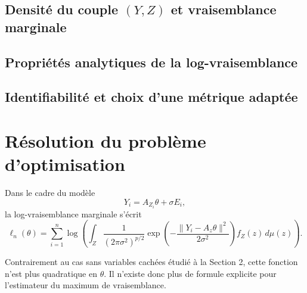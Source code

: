 \documentclass[12pt, a4paper]{article}
\theoremstyle{definition}
\begin{document}
\subsection{Densité du couple \texorpdfstring{$(Y, Z)$}{(Y,Z)} et vraisemblance marginale}
\label{subsec:densite}

\subsection{Propriétés analytiques de la log-vraisemblance}
\label{subsec:proprietes_ll}

\subsection{Identifiabilité et choix d'une métrique adaptée}
\label{subsec:identifiabilite}


\newpage


\section{Résolution du problème d’optimisation}
\label{sec:optimisation}

Dans le cadre du modèle
\[
Y_i = A_{Z_i}\theta + \sigma E_i,
\]
la log-vraisemblance marginale s’écrit
\[
\ell_n(\theta)
=
\sum_{i=1}^n
\log
\left(
\int_Z
\frac{1}{(2\pi\sigma^2)^{p/2}}
\exp\left(
-\frac{\|Y_i-A_z\theta\|^2}{2\sigma^2}
\right)
f_Z(z)\,d\mu(z)
\right).
\]

Contrairement au cas sans variables cachées étudié à la Section 2, cette fonction n’est plus quadratique en $\theta$. Il n’existe donc plus de formule explicite pour l’estimateur du maximum de vraisemblance.
\end{document}
